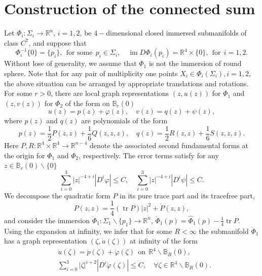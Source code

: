 \documentclass[11pt,letterpaper]{amsart}
\DeclareMathOperator{\im}{im}
\DeclareMathOperator{\tr}{tr}
\newcommand{\bR}{\mathbb{R}}
\theoremstyle{definition}
\theoremstyle{remark}
\numberwithin{equation}{section}
\begin{document}
\section{Construction of the connected sum}\label{connected-sum}
Let $\Phi_i:\Sigma_i\to \bR^n$, $i=1,2$, be $4-$dimensional closed immersed submanifolds of class $C^7$, and suppose that
\begin{equation*}
    \Phi^{-1}_i\{0\}=\{p_i\}, ~~\mbox{for some}~~ p_i\in \Sigma_i, \quad \im D\Phi_i (p_i)=\bR^4\times \{0\}, ~~\mbox{for}~~ i=1,2.
\end{equation*}
Without lose of generality, we assume that $\Phi_1$ is not the immersion of round sphere. 
Note that for any pair of multiplicity one points $X_i\in \Phi_i (\Sigma_i), i=1,2$, the above situation can be arranged by appropriate translations and rotations. For some $r>0$, there are local graph representations $(z, u(z))$ for $\Phi_1$ and $(z, v(z))$ for $\Phi_2$ of the form on $\mathbb{B}_{r}(0)$
\begin{equation}
        u(z)=p(z)+\varphi(z), \quad v(z)=q(z)+\psi(z),
\end{equation}
where $p(z)$ and $q(z)$ are polynomials of the form
\begin{equation}
    p(z)=\frac{1}{2}P(z,z)+\frac{1}{6}Q(z,z,z), \quad q(z)=\frac{1}{2}R(z,z)+\frac{1}{6}S(z,z,z).
\end{equation}
Here $P,R: \bR^4\times \bR^4\to \bR^{n-4}$ denote the associated second fundamental forms at the origin for $\Phi_1$ and $\Phi_2$, respectively. The error terms satisfy for any $z\in \mathbb{B}_r(0)\backslash \{0\}$
\begin{equation}
    \sum_{i=0}^{3} |z|^{-4+i}|D^{i}\varphi|\leq C, \quad \sum_{i=0}^{3} |z|^{-4+i}|D^{i}\psi|\leq C.
\end{equation}
We decompose the quadratic form $P$ in its pure trace part and its tracefree part,
\begin{equation*}
     P(z,z)=\frac{1}{4}(\tr P)|z|^2+\mathring{P}(z,z),
\end{equation*}
and consider the immersion $\mathring{\Phi}_1: \Sigma_1\backslash \{p_1\}\to \bR^n$, $\mathring{\Phi}_1(p)=\hat{\Phi}_1(p)-\frac{1}{4}\tr P$.
Using the expansion at infinity, we infer that for some $R<\infty$ the submanifold $\mathring{\Phi}_1$ has a graph representation $(\zeta, \mathring{u}(\zeta))$ at infinity of the form
\begin{equation*}
    \begin{split}
        &\mathring{u}(\zeta)=\mathring{p}(\zeta)+\mathring{\varphi}(\zeta) ~~\mbox{on}~~ \bR^4\backslash \mathbb{B}_R(0), \\
        & \sum_{i=0}^{3} |\zeta|^{i+2}|D^{i}\mathring{\varphi}(\zeta)|\leq C, \quad \forall \zeta\in \bR^4\backslash \mathbb{B}_R(0).
    \end{split}
\end{equation*}
\end{document}
